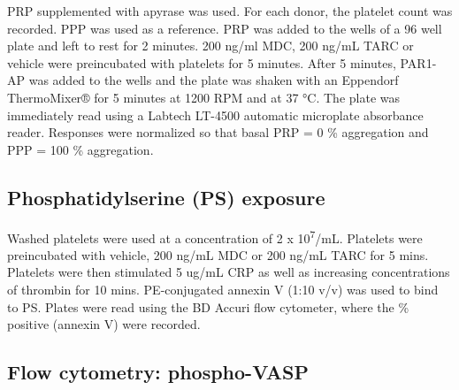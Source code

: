 \documentclass[11pt,twoside]{bristolthesis}
\begin{document}
PRP supplemented with apyrase was used. For each donor, the platelet count was recorded. PPP was used as a reference. PRP was added to the wells of a 96 well plate and left to rest for 2 minutes. 200 ng/ml MDC, 200 ng/mL TARC or vehicle were preincubated with platelets for 5 minutes. After 5 minutes, PAR1-AP was added to the wells and the plate was shaken with an Eppendorf ThermoMixer® for 5 minutes at 1200 RPM and at 37 °C. The plate was immediately read using a Labtech LT-4500 automatic microplate absorbance reader. Responses were normalized so that basal PRP = 0 \% aggregation and PPP = 100 \% aggregation.

\hypertarget{phosphatidylserine-ps-exposure}{%
\subsection{Phosphatidylserine (PS) exposure}\label{phosphatidylserine-ps-exposure}}

Washed platelets were used at a concentration of 2 x 10\textsuperscript{7}/mL. Platelets were preincubated with vehicle, 200 ng/mL MDC or 200 ng/mL TARC for 5 mins. Platelets were then stimulated 5 ug/mL CRP as well as increasing concentrations of thrombin for 10 mins. PE-conjugated annexin V (1:10 v/v) was used to bind to PS. Plates were read using the BD Accuri flow cytometer, where the \% positive (annexin V) were recorded.

\hypertarget{flow-cytometry-phospho-vasp}{%
\subsection{Flow cytometry: phospho-VASP}\label{flow-cytometry-phospho-vasp}}
\end{document}
